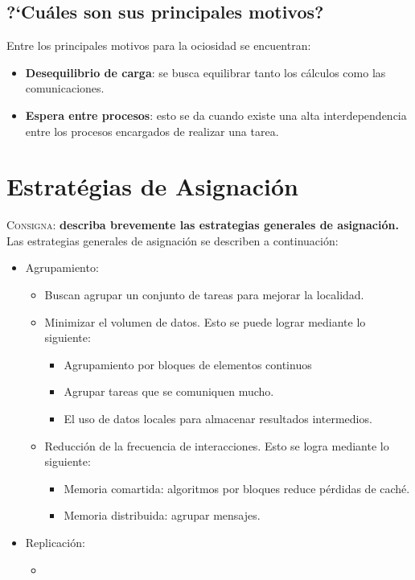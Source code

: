 \documentclass{article}
\begin{document}
\subsection{?`Cu\'ales son sus principales motivos?}
Entre los principales motivos para la ociosidad se encuentran:
\begin{itemize}
\item \textbf{Desequilibrio de carga}: se busca equilibrar tanto los
c\'alculos como las comunicaciones.
\item \textbf{Espera entre procesos}: esto se da cuando existe una alta
interdependencia entre los procesos encargados de realizar una tarea.
\end{itemize}

\section{Estrat\'egias de Asignaci\'on}
\textsc{Consigna}: \textbf{describa brevemente las estrategias generales de
asignaci\'on.}\\

Las estrategias generales de asignaci\'on se describen a continuaci\'on:
\begin{itemize}
\item Agrupamiento:
	\begin{itemize}
	\item Buscan agrupar un conjunto de tareas para mejorar la localidad.
	\item Minimizar el volumen de datos.
	Esto se puede lograr mediante lo siguiente:
		\begin{itemize}
		\item Agrupamiento por bloques de elementos continuos
		\item Agrupar tareas que se comuniquen mucho.
		\item El uso de datos locales para almacenar resultados
intermedios.
		\end{itemize}
	\item Reducci\'on de la frecuencia de interacciones.
	Esto se logra mediante lo siguiente:
		\begin{itemize}
		\item Memoria comartida: algoritmos por bloques reduce
p\'erdidas de cach\'e.
		\item Memoria distribuida: agrupar mensajes.
		\end{itemize}
	\end{itemize}
\item Replicaci\'on:
	\begin{itemize}
	\item
	\end{itemize}
\end{itemize}
\end{document}
